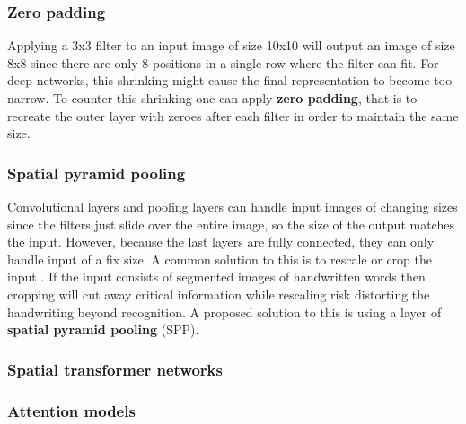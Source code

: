 \subsubsection{Zero padding}

Applying a 3x3 filter to an input image of size 10x10 will output an image of size 8x8 since there are only 8 positions in a single row where the filter can fit. For deep networks, this shrinking might cause the final representation to become too narrow. To counter this shrinking one can apply \textbf{zero padding}, that is to recreate the outer layer with zeroes after each filter in order to maintain the same size.

\subsubsection{Spatial pyramid pooling}

Convolutional layers and pooling layers can handle input images of changing sizes since the filters just slide over the entire image, so the size of the output matches the input.
However, because the last layers are fully connected, they can only handle input of a fix size. A common solution to this is to rescale or crop the input \cite{FornesCnnCategorization}. If the input consists of segmented images of handwritten words then cropping will cut away critical information while rescaling risk distorting the handwriting beyond recognition. A proposed solution to this is using a layer of \textbf{spatial pyramid pooling} (SPP).

\subsubsection{Spatial transformer networks}


\subsubsection{Attention models}



